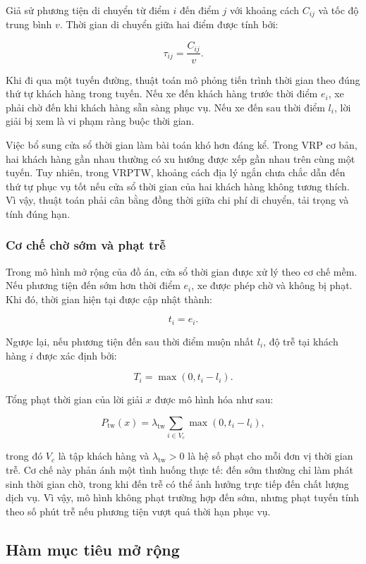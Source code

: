 \documentclass[12pt,a4paper]{article}
\numberwithin{figure}{subsection}
\numberwithin{table}{subsection}
\begin{document}
Giả sử phương tiện di chuyển từ điểm $i$ đến điểm $j$ với khoảng cách $C_{ij}$ và tốc độ trung bình $v$. Thời gian di chuyển giữa hai điểm được tính bởi:

\[
\tau_{ij} = \frac{C_{ij}}{v}.
\]

Khi đi qua một tuyến đường, thuật toán mô phỏng tiến trình thời gian theo đúng thứ tự khách hàng trong tuyến. Nếu xe đến khách hàng trước thời điểm $e_i$, xe phải chờ đến khi khách hàng sẵn sàng phục vụ. Nếu xe đến sau thời điểm $l_i$, lời giải bị xem là vi phạm ràng buộc thời gian.

Việc bổ sung cửa sổ thời gian làm bài toán khó hơn đáng kể. Trong VRP cơ bản, hai khách hàng gần nhau thường có xu hướng được xếp gần nhau trên cùng một tuyến. Tuy nhiên, trong VRPTW, khoảng cách địa lý ngắn chưa chắc dẫn đến thứ tự phục vụ tốt nếu cửa sổ thời gian của hai khách hàng không tương thích. Vì vậy, thuật toán phải cân bằng đồng thời giữa chi phí di chuyển, tải trọng và tính đúng hạn.

\subsubsection{Cơ chế chờ sớm và phạt trễ}

Trong mô hình mở rộng của đồ án, cửa sổ thời gian được xử lý theo cơ chế mềm. Nếu phương tiện đến sớm hơn thời điểm $e_i$, xe được phép chờ và không bị phạt. Khi đó, thời gian hiện tại được cập nhật thành:

\[
t_i = e_i.
\]

Ngược lại, nếu phương tiện đến sau thời điểm muộn nhất $l_i$, độ trễ tại khách hàng $i$ được xác định bởi:

\[
T_i = \max(0, t_i - l_i).
\]

Tổng phạt thời gian của lời giải $x$ được mô hình hóa như sau:

\[
P_{\text{tw}}(x)
=
\lambda_{\text{tw}}
\sum_{i \in V_c}
\max(0, t_i - l_i),
\]

trong đó $V_c$ là tập khách hàng và $\lambda_{\text{tw}} > 0$ là hệ số phạt cho mỗi đơn vị thời gian trễ. Cơ chế này phản ánh một tình huống thực tế: đến sớm thường chỉ làm phát sinh thời gian chờ, trong khi đến trễ có thể ảnh hưởng trực tiếp đến chất lượng dịch vụ. Vì vậy, mô hình không phạt trường hợp đến sớm, nhưng phạt tuyến tính theo số phút trễ nếu phương tiện vượt quá thời hạn phục vụ.

\subsection{Hàm mục tiêu mở rộng}
\end{document}
